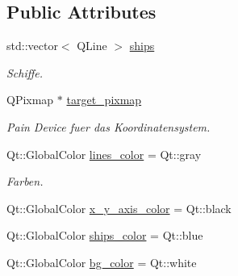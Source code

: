\subsection*{Public Attributes}
\begin{DoxyCompactItemize}
\item 
std\+::vector$<$ Q\+Line $>$ \hyperlink{classGUI_1_1CoordinateSystem_aace79121ea432bad20264eafaec2e60f}{ships}
\begin{DoxyCompactList}\small\item\em Schiffe. \end{DoxyCompactList}\item 
Q\+Pixmap $\ast$ \hyperlink{classGUI_1_1CoordinateSystem_a4e0ef07bc83595ef2208e719435b2bdb}{target\+\_\+pixmap}
\begin{DoxyCompactList}\small\item\em Pain Device fuer das Koordinatensystem. \end{DoxyCompactList}\item 
Qt\+::\+Global\+Color \hyperlink{classGUI_1_1CoordinateSystem_a10cc8a23e9d2e122f5160ac6cc8c024a}{lines\+\_\+color} = Qt\+::gray
\begin{DoxyCompactList}\small\item\em Farben. \end{DoxyCompactList}\item 
Qt\+::\+Global\+Color \hyperlink{classGUI_1_1CoordinateSystem_a105b11a9cc588b3a0b7c6208b270d5c9}{x\+\_\+y\+\_\+axis\+\_\+color} = Qt\+::black
\item 
Qt\+::\+Global\+Color \hyperlink{classGUI_1_1CoordinateSystem_aade80ae99e4ee3610c175da220484c30}{ships\+\_\+color} = Qt\+::blue
\item 
Qt\+::\+Global\+Color \hyperlink{classGUI_1_1CoordinateSystem_a8263857bd70758bdb9272b15dc87f55f}{bg\+\_\+color} = Qt\+::white
\end{DoxyCompactItemize}

